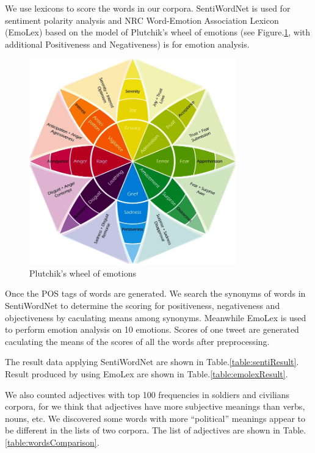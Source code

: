 We use lexicons to score the words in our corpora. SentiWordNet is used for sentiment polarity analysis and NRC Word-Emotion Association Lexicon (EmoLex) \citep{Mohammad13} based on the model of Plutchik’s wheel of emotions \citep{plutchik2003emotions} (see Figure.\ref{fig:wheel}, with additional Positiveness and Negativeness) is for emotion analysis.

\begin{figure}[h]
  \centering
  \includegraphics[width=0.8\textwidth]{images/wheel-of-emotions.jpg}
  \caption{Plutchik’s wheel of emotions}
  \label{fig:wheel}
\end{figure}

Once the POS tags of words are generated. We search the synonyms of words in SentiWordNet to determine the scoring for positiveness, negativeness and objectiveness by caculating means among synonyms. Meanwhile EmoLex is used to perform emotion analysis on 10 emotions. Scores of one tweet are generated caculating the means of the scores of all the words after preprocessing.

The result data applying SentiWordNet are shown in Table.\ref{table:sentiResult}.
Result produced by using EmoLex are shown in Table.\ref{table:emolexResult}.

We also counted adjectives with top 100 frequencies in soldiers and civilians corpora, for we think that adjectives have more subjective meanings than verbs, nouns, etc. We discovered some words with more \enquote{political} meanings appear to be different in the lists of two corpora. The list of adjectives are shown in Table.\ref{table:wordsComparison}.


